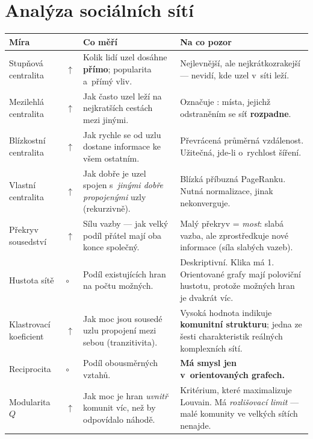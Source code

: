 \documentclass[11pt,a4paper]{article}
\makeatletter
\newcommand{\up}{\textcolor{upcol}{$\boldsymbol{\uparrow}$}}
\newcommand{\neut}{$\circ$}
\newenvironment{mirytab}{%
  \par\medskip\noindent\small
  \begin{tabular}{@{}>{\raggedright\arraybackslash}p{3.15cm}
                    >{\centering\arraybackslash}p{0.85cm}
                    >{\raggedright\arraybackslash}p{5.3cm}
                    >{\raggedright\arraybackslash}p{6.1cm}@{}}
  \toprule
  \textbf{Míra} & & \textbf{Co měří} & \textbf{Na co pozor} \\
  \midrule}%
  {\bottomrule\end{tabular}\par\medskip}
\makeatother
\begin{document}
\section{Analýza sociálních sítí}

\begin{mirytab}
Stupňová centralita & \up &
Kolik lidí uzel dosáhne \textbf{přímo}; popularita a~přímý vliv. &
Nejlevnější, ale nejkrátkozrakejší --- nevidí, kde uzel v~síti leží. \\[2pt]

Mezilehlá centralita & \up &
Jak často uzel leží na nejkratších cestách mezi jinými. &
Označuje \uv{mosty}: místa, jejichž odstraněním se síť \textbf{rozpadne}. \\[2pt]

Blízkostní centralita & \up &
Jak rychle se od uzlu dostane informace ke všem ostatním. &
Převrácená průměrná vzdálenost. Užitečná, jde-li o~rychlost šíření. \\[2pt]

Vlastní centralita & \up &
Jak dobře je uzel spojen s~\emph{jinými dobře propojenými} uzly (rekurzivně). &
Blízká příbuzná PageRanku. Nutná normalizace, jinak nekonverguje. \\[2pt]

Překryv sousedství & \up &
Sílu vazby --- jak velký podíl přátel mají oba konce společný. &
Malý překryv = \emph{most}: slabá vazba, ale zprostředkuje nové informace
(síla slabých vazeb). \\[2pt]

Hustota sítě & \neut &
Podíl existujících hran na počtu možných. &
Deskriptivní. Klika má 1. Orientované grafy mají poloviční hustotu, protože možných
hran je dvakrát víc. \\[2pt]

Klastrovací koeficient & \up &
Jak moc jsou sousedé uzlu propojení mezi sebou (tranzitivita). &
Vysoká hodnota indikuje \textbf{komunitní strukturu}; jedna ze šesti charakteristik
reálných komplexních sítí. \\[2pt]

Reciprocita & \neut &
Podíl obousměrných vztahů. &
\textbf{Má smysl jen v~orientovaných grafech.} \\[2pt]

Modularita $Q$ & \up &
Jak moc je hran \emph{uvnitř} komunit víc, než by odpovídalo náhodě. &
Kritérium, které maximalizuje Louvain. Má \emph{rozlišovací limit} --- malé komunity
ve velkých sítích nenajde. \\[2pt]


\end{mirytab}
\end{document}
